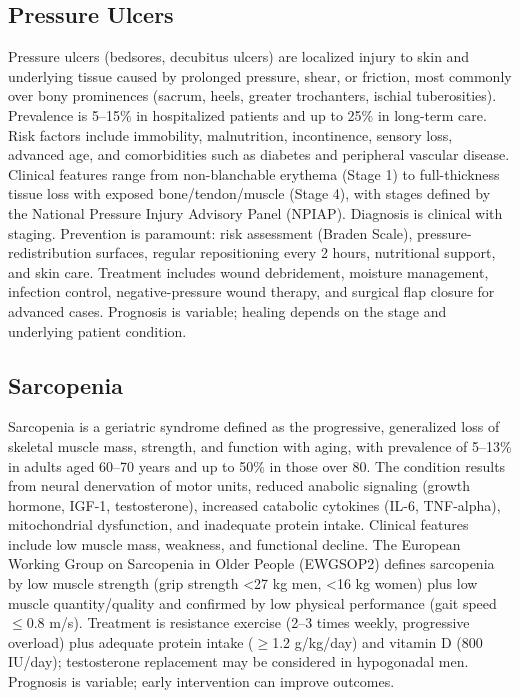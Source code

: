 \subsection{Pressure Ulcers}
\label{sec:Pressure Ulcers}

Pressure ulcers (bedsores, decubitus ulcers) are localized injury to skin and underlying tissue caused by prolonged pressure, shear, or friction, most commonly over bony prominences (sacrum, heels, greater trochanters, ischial tuberosities). Prevalence is 5--15\% in hospitalized patients and up to 25\% in long-term care. Risk factors include immobility, malnutrition, incontinence, sensory loss, advanced age, and comorbidities such as diabetes and peripheral vascular disease. Clinical features range from non-blanchable erythema (Stage 1) to full-thickness tissue loss with exposed bone/tendon/muscle (Stage 4), with stages defined by the National Pressure Injury Advisory Panel (NPIAP). Diagnosis is clinical with staging. Prevention is paramount: risk assessment (Braden Scale), pressure-redistribution surfaces, regular repositioning every 2 hours, nutritional support, and skin care. Treatment includes wound debridement, moisture management, infection control, negative-pressure wound therapy, and surgical flap closure for advanced cases. Prognosis is variable; healing depends on the stage and underlying patient condition.

\subsection{Sarcopenia}
\label{sec:Sarcopenia}

Sarcopenia is a geriatric syndrome defined as the progressive, generalized loss of skeletal muscle mass, strength, and function with aging, with prevalence of 5--13\% in adults aged 60--70 years and up to 50\% in those over 80. The condition results from neural denervation of motor units, reduced anabolic signaling (growth hormone, IGF-1, testosterone), increased catabolic cytokines (IL-6, TNF-alpha), mitochondrial dysfunction, and inadequate protein intake. Clinical features include low muscle mass, weakness, and functional decline. The European Working Group on Sarcopenia in Older People (EWGSOP2) defines sarcopenia by low muscle strength (grip strength <27 kg men, <16 kg women) plus low muscle quantity/quality and confirmed by low physical performance (gait speed $\leq$0.8 m/s). Treatment is resistance exercise (2--3 times weekly, progressive overload) plus adequate protein intake ($\ge$1.2 g/kg/day) and vitamin D (800 IU/day); testosterone replacement may be considered in hypogonadal men. Prognosis is variable; early intervention can improve outcomes.


